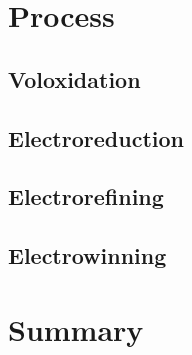 \documentclass[12pts,answers]{exam}
\begin{document}
\section{Process}
\subsection{Voloxidation}

\subsection{Electroreduction}

\subsection{Electrorefining}

\subsection{Electrowinning}
\section{Summary}



\end{document}
